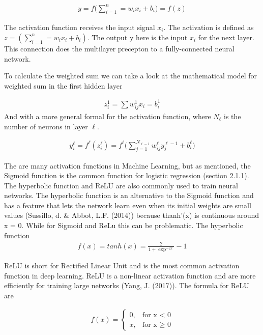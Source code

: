 \documentclass[11pt,english, A4]{article}
\begin{document}
\begin{align}
y = f\Big(\sum_{i = 1}^{n} = {w_i {x_i} + b_i}\Big) = f(z) 
\end{align}

The activation function receives the input signal $x_i$. The activation is defined as ${z} = (\sum_{i = 1}^{n} = {w_i {x_i} + b_i})$. The output y here is the input $x_i$ for the next layer. This connection does the multilayer precepton to a fully-connected neural network. 

To calculate the weighted sum we can take a look at the mathematical model for weighted sum in the first hidden layer

\begin{align}
z_i^1 = \sum w_{ij}^1 x_i = b_i^1 
\end{align}
And with a more general formal for the activation function, where $N_\ell$ is the number of neurons in layer $\ell$. 

\begin{align}
y_i^\ell = f^\ell(z_i^\ell) = f^\ell \Big(\sum_{j = 1}^{N_{\ell-1}} w_{ij}^\ell y_j^{\ell - 1} + b_i^\ell \Big) 
\end{align}

The are many activation functions in Machine Learning, but as mentioned, the Sigmoid function is the common function for logistic regression (section 2.1.1). The hyperbolic function and ReLU are also commonly used to train neural networks. The hyperbolic function is an alternative to the Sigmoid function and has a feature that lets the network learn
even when its initial weights are small values (Sussillo, d. \& Abbot, L.F. (2014)) because thanh'(x) is continuous around x = 0. While for Sigmoid and ReLu this can be problematic. The hyperbolic function 
\begin{align}
f(x) = tanh(x) = \frac{2}{1+\exp^{-2x}} -1
\end{align}

ReLU is short for Rectified Linear Unit and is the most common activation function in deep learning. ReLU is a non-linear activation function and are more efficiently for training large networks (Yang, J. (2017)). The formula for ReLU are

\begin{align}
f(x) = \begin{cases}
	  0,  &\text{for x < 0}\\
	  x,  &\text{for x $\geq$ 0}
	  \end{cases}
\end{align}
\end{document}
